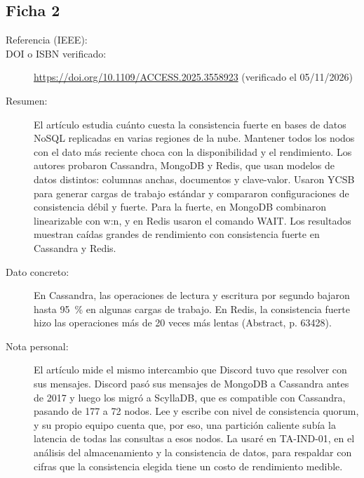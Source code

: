 \subsection{Ficha 2}
\begin{description}
  \item[Referencia (IEEE):] 
  \item[DOI o ISBN verificado:] \url{https://doi.org/10.1109/ACCESS.2025.3558923} (verificado el 05/11/2026)
  \item[Resumen:] El artículo estudia cuánto cuesta la consistencia fuerte en bases de datos NoSQL replicadas en varias regiones de la nube. Mantener todos los nodos con el dato más reciente choca con la disponibilidad y el rendimiento. Los autores probaron Cassandra, MongoDB y Redis, que usan modelos de datos distintos: columnas anchas, documentos y clave-valor. Usaron YCSB para generar cargas de trabajo estándar y compararon configuraciones de consistencia débil y fuerte. Para la fuerte, en MongoDB combinaron linearizable con w:n, y en Redis usaron el comando WAIT. Los resultados muestran caídas grandes de rendimiento con consistencia fuerte en Cassandra y Redis.
  \item[Dato concreto:] En Cassandra, las operaciones de lectura y escritura por segundo bajaron hasta 95~\% en algunas cargas de trabajo. En Redis, la consistencia fuerte hizo las operaciones más de 20 veces más lentas (Abstract, p. 63428).
  \item[Nota personal:] El artículo mide el mismo intercambio que Discord tuvo que resolver con sus mensajes. Discord pasó sus mensajes de MongoDB a Cassandra antes de 2017 y luego los migró a ScyllaDB, que es compatible con Cassandra, pasando de 177 a 72 nodos. Lee y escribe con nivel de consistencia quorum, y su propio equipo cuenta que, por eso, una partición caliente subía la latencia de todas las consultas a esos nodos. La usaré en TA-IND-01, en el análisis del almacenamiento y la consistencia de datos, para respaldar con cifras que la consistencia elegida tiene un costo de rendimiento medible.
\end{description}

